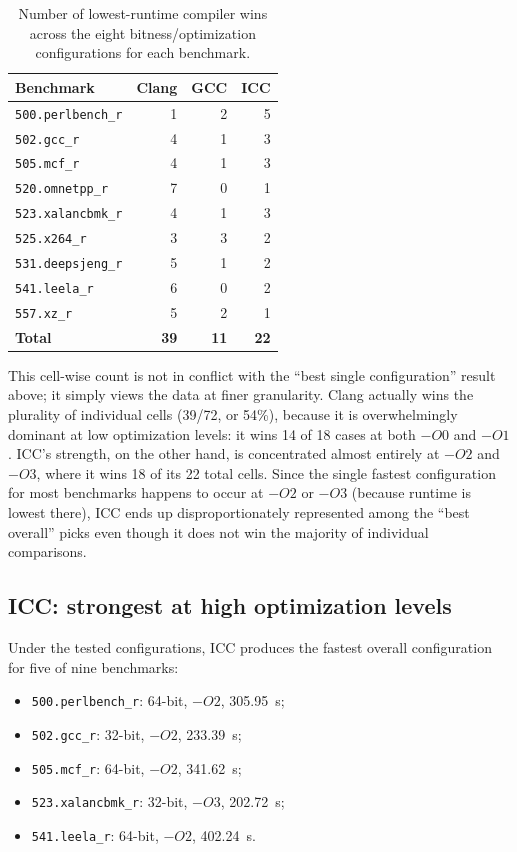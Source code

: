 \documentclass[11pt,a4paper]{article}
\newcommand{\bench}[1]{\texttt{#1}}
\begin{document}
\begin{table}[H]
\centering
\caption{Number of lowest-runtime compiler wins across the eight bitness/optimization
configurations for each benchmark.}
\label{tab:wins_by_bench}
\begin{tabular}{lrrr}
\toprule
Benchmark & Clang & GCC & ICC \\
\midrule
\bench{500.perlbench\_r} & 1 & 2 & 5 \\
\bench{502.gcc\_r}       & 4 & 1 & 3 \\
\bench{505.mcf\_r}       & 4 & 1 & 3 \\
\bench{520.omnetpp\_r}   & 7 & 0 & 1 \\
\bench{523.xalancbmk\_r} & 4 & 1 & 3 \\
\bench{525.x264\_r}      & 3 & 3 & 2 \\
\bench{531.deepsjeng\_r} & 5 & 1 & 2 \\
\bench{541.leela\_r}     & 6 & 0 & 2 \\
\bench{557.xz\_r}        & 5 & 2 & 1 \\
\midrule
\textbf{Total} & \textbf{39} & \textbf{11} & \textbf{22} \\
\bottomrule
\end{tabular}
\end{table}

This cell-wise count is not in conflict with the ``best single configuration'' result above;
it simply views the data at finer granularity. Clang actually wins the plurality of individual
cells (39/72, or 54\%), because it is overwhelmingly dominant at low optimization levels: it
wins 14 of 18 cases at both $-O0$ and $-O1$. ICC's strength, on the other hand, is concentrated
almost entirely at $-O2$ and $-O3$, where it wins 18 of its 22 total cells. Since the single
fastest configuration for most benchmarks happens to occur at $-O2$ or $-O3$ (because runtime is
lowest there), ICC ends up disproportionately represented among the ``best overall'' picks even
though it does not win the majority of individual comparisons.

\subsection{ICC: strongest at high optimization levels}

Under the tested configurations, ICC produces the fastest overall configuration for
five of nine benchmarks:

\begin{itemize}[leftmargin=*]
    \item \bench{500.perlbench\_r}: 64-bit, $-O2$, \SI{305.95}{s};
    \item \bench{502.gcc\_r}: 32-bit, $-O2$, \SI{233.39}{s};
    \item \bench{505.mcf\_r}: 64-bit, $-O2$, \SI{341.62}{s};
    \item \bench{523.xalancbmk\_r}: 32-bit, $-O3$, \SI{202.72}{s};
    \item \bench{541.leela\_r}: 64-bit, $-O2$, \SI{402.24}{s}.
\end{itemize}
\end{document}
